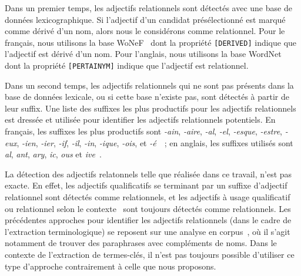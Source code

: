         Dans un premier temps, les adjectifs relationnels sont détectés avec une
        base de données lexicographique. Si l'adjectif d'un candidat
        présélectionné est marqué comme dérivé d'un nom, alors nous le
        considérons comme relationnel. Pour le français, nous utilisons la base
        WoNeF~\cite{pradet2013wonef} dont la propriété \texttt{[DERIVED]}
        indique que l'adjectif est dérivé d'un nom. Pour l'anglais, nous
        utilisons la base  WordNet~\cite{miller1995wordnet} dont la propriété
        \texttt{[PERTAINYM]} indique que l'adjectif est relationnel.

        Dans un second temps, les adjectifs relationnels qui ne sont pas
        présents dans la base de données lexicale, ou si cette base n'existe
        pas, sont détectés à partir de leur suffix. Une liste des suffixes les
        plus productifs pour les adjectifs relationnels est dressée et utilisée
        pour identifier les adjectifs relationnels potentiels. En français, les
        suffixes les plus productifs sont \textit{-ain}, \textit{-aire},
        \textit{-al}, \textit{-el}, \textit{-esque}, \textit{-estre},
        \textit{-eux}, \textit{-ien}, \textit{-ier}, \textit{-if}, \textit{-il},
        \textit{-in}, \textit{-ique}, \textit{-ois}, et
        \textit{-é}~\cite{guyon1993adjectifsrelationnels}~; en anglais, les
        suffixes utilisés sont \textit{al}, \textit{ant},
        \textit{ary}, \textit{ic}, \textit{ous} et
        \textit{ive}~\cite{grabar2006terminologystructuring}.

        La détection des adjectifs relatonnels telle que réalisée dans ce
        travail, n'est pas exacte. En effet, les adjectifs qualificatifs se
        terminant par un suffixe d'adjectif relationnel sont détectés comme
        relationnels, et les adjectifs à usage qualificatif ou relationnel selon
        le contexte~\cite{maniez2009denominaladjectives} sont toujours détectés
        comme relationnels. Les précédentes
        approches pour identifier les adjectifs relationnels (dans le cadre de
        l'extraction terminologique) se reposent sur une analyse en
        corpus~\cite{daille2001relationaladjectives,maniez2005automaticrelationaladjectiveidentification,harastani2013relationaladjectivetranslation},
        où il s'agit notamment de trouver des paraphrases avec compléments de
        noms. Dans le contexte de l'extraction de termes-clés, il n'est pas
        toujours possible d'utiliser ce type d'approche contrairement à celle
        que nous proposons.


